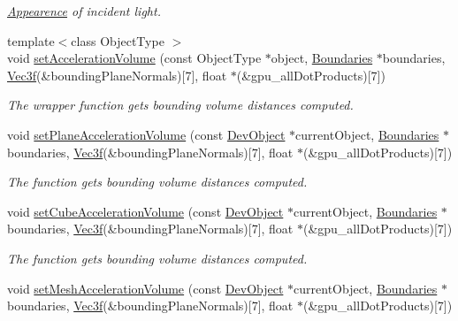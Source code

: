 \begin{DoxyCompactItemize}
\begin{DoxyCompactList}\small\item\em \hyperlink{struct_appearence}{Appearence} of incident light. \end{DoxyCompactList}\item 
{\footnotesize template$<$class Object\+Type $>$ }\\void \hyperlink{describers_8cu_a62894bfe2e9e2b1cd55216c772eafb27}{set\+Acceleration\+Volume} (const Object\+Type $\ast$object, \hyperlink{class_boundaries}{Boundaries} $\ast$boundaries, \hyperlink{class_vec3}{Vec3f}(\&bounding\+Plane\+Normals)\mbox{[}7\mbox{]}, float $\ast$(\&gpu\+\_\+all\+Dot\+Products)\mbox{[}7\mbox{]})
\begin{DoxyCompactList}\small\item\em The wrapper function gets bounding volume distances computed. \end{DoxyCompactList}\item 
void \hyperlink{group__intersection__test__prperties_ga684f41eb2add27e32a7c0115cdd6cce1}{set\+Plane\+Acceleration\+Volume} (const \hyperlink{class_dev_object}{Dev\+Object} $\ast$current\+Object, \hyperlink{class_boundaries}{Boundaries} $\ast$boundaries, \hyperlink{class_vec3}{Vec3f}(\&bounding\+Plane\+Normals)\mbox{[}7\mbox{]}, float $\ast$(\&gpu\+\_\+all\+Dot\+Products)\mbox{[}7\mbox{]})
\begin{DoxyCompactList}\small\item\em The function gets bounding volume distances computed. \end{DoxyCompactList}\item 
void \hyperlink{group__intersection__test__prperties_gabfac85fdf9d0cceb70aefa4c2ed71ad2}{set\+Cube\+Acceleration\+Volume} (const \hyperlink{class_dev_object}{Dev\+Object} $\ast$current\+Object, \hyperlink{class_boundaries}{Boundaries} $\ast$boundaries, \hyperlink{class_vec3}{Vec3f}(\&bounding\+Plane\+Normals)\mbox{[}7\mbox{]}, float $\ast$(\&gpu\+\_\+all\+Dot\+Products)\mbox{[}7\mbox{]})
\begin{DoxyCompactList}\small\item\em The function gets bounding volume distances computed. \end{DoxyCompactList}\item 
void \hyperlink{group__intersection__test__prperties_ga672ecbee3aea2f5567ad7a2611feef3e}{set\+Mesh\+Acceleration\+Volume} (const \hyperlink{class_dev_object}{Dev\+Object} $\ast$current\+Object, \hyperlink{class_boundaries}{Boundaries} $\ast$boundaries, \hyperlink{class_vec3}{Vec3f}(\&bounding\+Plane\+Normals)\mbox{[}7\mbox{]}, float $\ast$(\&gpu\+\_\+all\+Dot\+Products)\mbox{[}7\mbox{]})

\end{DoxyCompactItemize}

